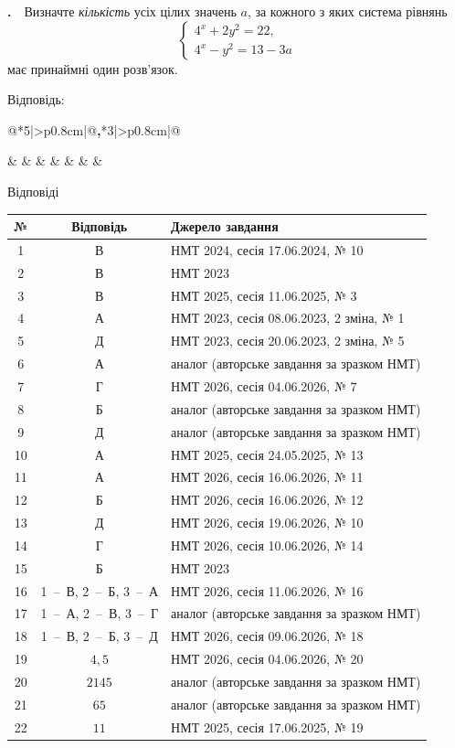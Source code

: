 \documentclass[12pt]{article}
\makeatletter
\newcommand{\sectionTitle}[1]{%
\par\vspace{0.4cm}
\begin{tcolorbox}[colback=titleBg, colframe=titleBg, boxrule=0pt, arc=8pt,
    halign=center, fontupper=\Large\bfseries\color{mainGreen}]
\hyphenpenalty=10000 \exhyphenpenalty=10000 #1
\end{tcolorbox}
\par\vspace{0.3cm}
}
\newcommand{\nmtAnswerBox}{%
\par\nopagebreak\vspace{0.2cm}\noindent
Відповідь:\ \
\begin{tabular}{@{}*{4}{|>{\centering\arraybackslash}p{0.8cm}}|@{\hspace{0.1cm}\textbf{,}\hspace{0.1cm}}*{3}{|>{\centering\arraybackslash}p{0.8cm}}|@{}}
\hline
\rule[-0.2cm]{0pt}{0.7cm} & & & & & & \\
\hline
\end{tabular}
\par\vspace{0.3cm}
}
\newcounter{zad}
\newcommand{\zadnum}{\stepcounter{zad}\textbf{\thezad.}\ \ }
\newcommand{\nbvspace}[1]{\nopagebreak\vspace{#1}}
\newcommand{\nmtnobreak}{\ifvmode\penalty10000 \fi}
\renewcommand{\nmtAnswerBox}{%
\par\nopagebreak\vspace{0.2cm}\noindent
Відповідь:\ \
\begin{tabular}{@{}*{5}{|>{\centering\arraybackslash}p{0.8cm}}|@{\hspace{0.1cm}\textbf{,}\hspace{0.1cm}}*{3}{|>{\centering\arraybackslash}p{0.8cm}}|@{}}
\hline
\rule[-0.2cm]{0pt}{0.7cm} & & & & & & & \\
\hline
\end{tabular}
\par\vspace{0.3cm}
}
\makeatother
\begin{document}
\begin{samepage}
\noindent\zadnum Визначте \textit{кількість} усіх цілих значень $a$, за кожного з яких система рівнянь
$$
\begin{cases}
4^x + 2y^2 = 22, \\
4^x - y^2 = 13 - 3a
\end{cases}
$$
має принаймні один розв'язок.

\nmtnobreak
\nopagebreak\nbvspace{0.3cm}
\nmtAnswerBox
\par{}
\end{samepage}
\endgroup

\clearpage
\sectionTitle{Відповіді}

\begin{center}\small\renewcommand{\arraystretch}{1.25}
\begin{tabular}{|c|c|p{}|}\hline
\textbf{№} & \textbf{Відповідь} & \textbf{Джерело завдання} \\ \hline
1 & В & НМТ 2024, сесія 17.06.2024, № 10 \\ \hline
2 & В & НМТ 2023 \\ \hline
3 & В & НМТ 2025, сесія 11.06.2025, № 3 \\ \hline
4 & А & НМТ 2023, сесія 08.06.2023, 2 зміна, № 1 \\ \hline
5 & Д & НМТ 2023, сесія 20.06.2023, 2 зміна, № 5 \\ \hline
6 & А & аналог (авторське завдання за зразком НМТ) \\ \hline
7 & Г & НМТ 2026, сесія 04.06.2026, № 7 \\ \hline
8 & Б & аналог (авторське завдання за зразком НМТ) \\ \hline
9 & Д & аналог (авторське завдання за зразком НМТ) \\ \hline
10 & А & НМТ 2025, сесія 24.05.2025, № 13 \\ \hline
11 & А & НМТ 2026, сесія 16.06.2026, № 11 \\ \hline
12 & Б & НМТ 2026, сесія 16.06.2026, № 12 \\ \hline
13 & Д & НМТ 2026, сесія 19.06.2026, № 10 \\ \hline
14 & Г & НМТ 2026, сесія 10.06.2026, № 14 \\ \hline
15 & Б & НМТ 2023 \\ \hline
16 & 1~--~В, 2~--~Б, 3~--~А & НМТ 2026, сесія 11.06.2026, № 16 \\ \hline
17 & 1~--~А, 2~--~В, 3~--~Г & аналог (авторське завдання за зразком НМТ) \\ \hline
18 & 1~--~В, 2~--~Б, 3~--~Д & НМТ 2026, сесія 09.06.2026, № 18 \\ \hline
19 & $4{,}5$ & НМТ 2026, сесія 04.06.2026, № 20 \\ \hline
20 & $2145$ & аналог (авторське завдання за зразком НМТ) \\ \hline
21 & $65$ & аналог (авторське завдання за зразком НМТ) \\ \hline
22 & $11$ & НМТ 2025, сесія 17.06.2025, № 19 \\ \hline
\end{tabular}\end{center}

\end{document}
